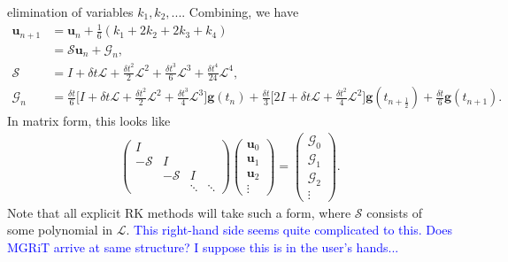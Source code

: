 \documentclass[a4paper,12pt]{article}
\newcommand{\tcb}{\textcolor{blue}}
\begin{document}
elimination of variables $k_1,k_2,...$. Combining, we have 
%
\begin{align*}
\mathbf{u}_{n+1} & = \mathbf{u}_n + \tfrac{1}{6}(k_1+2k_2+2k_3+k_4) \\
	& = \mathcal{S}\mathbf{u}_n + \mathcal{G}_n, \\
\mathcal{S} & = I + \delta t\mathcal{L} + \tfrac{\delta t^2}{2}\mathcal{L}^2 + \tfrac{\delta t^3}{6}\mathcal{L}^3 +
	\tfrac{\delta t^4}{24}\mathcal{L}^4, \\
\mathcal{G}_n & = \tfrac{\delta t}{6}\Big[ I  +\delta t \mathcal{L} + \tfrac{\delta t^2}{2}\mathcal{L}^2 + \tfrac{\delta t^3}{4}\mathcal{L}^3\Big] \mathbf{g}(t_{n}) +
	\tfrac{\delta t}{3}\Big[2I + \delta t \mathcal{L} + \tfrac{\delta t^2}{4}\mathcal{L}^2\Big]\mathbf{g}(t_{n+\frac{1}{2}}) + \tfrac{\delta t}{6} \mathbf{g}(t_{n+1}).
\end{align*}
%
In matrix form, this looks like
%
\begin{align} \label{eq:condensed}
\begin{pmatrix} 
I \\ -\mathcal{S} & I \\ & -\mathcal{S} & I \\ && \ddots & \ddots \end{pmatrix} \begin{pmatrix} \mathbf{u}_0 \\ \mathbf{u}_1 \\\mathbf{u}_2 \\ \vdots \end{pmatrix}
	= \begin{pmatrix} \mathcal{G}_0 \\ \mathcal{G}_1 \\ \mathcal{G}_2 \\ \vdots \end{pmatrix}.
\end{align}
%
Note that all explicit RK methods will take such a form, where $\mathcal{S}$ consists of some polynomial in $\mathcal{L}$.
\tcb{This right-hand side seems quite complicated to this. Does MGRiT arrive at same structure? I suppose this is in the user's hands...}
\end{document}
